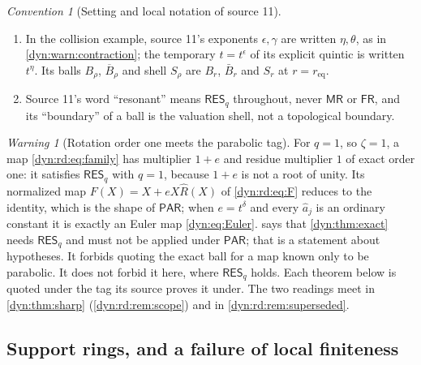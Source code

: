 \documentclass[11pt,letterpaper]{article}
\theoremstyle{definition}
\theoremstyle{remark}
\newtheorem{warning}[warning]{Warning}
\newtheorem{convention}[convention]{Convention}
\newcommand{\resq}{\mathsf{RES}_q}
\newcommand{\mres}{\mathsf{MR}}
\newcommand{\fres}{\mathsf{FR}}
\newcommand{\pares}{\mathsf{PAR}}
\numberwithin{equation}{section}
\begin{document}
\begin{convention}[Setting and local notation of source 11]
\begin{enumerate}[label=(\roman*)]
$\varsigma_\ell$, the elements $b_\ell$ are written $\mathfrak b_\ell$, the
polynomial $P(U)=\prod_\ell(U-b_\ell)$ is written $\mathcal S(U)$ with
coefficients $s_j$, the number $r$ of shells is written $N$, the maximum
$\sigma=\max_\ell\rho_\ell$ is written $r_{\max}$, a solution $\alpha$ of
$\alpha^{m}=c_\ell$ is written $\vartheta$, the reciprocal map $G$ is written
$f^{\vee}$, the clearing exponent $L$ is written $L_{\mathrm{cl}}$, and the
class $\Pi$ of purely infinite forms is written $\mathbb J$. In this report
$c=\lambda^{q}-1$, $G$ is the rescaled return \eqref{dyn:eq:G}, $\sigma$ is
the drifted rate, and $\Pi$ is the action projection of
\cref{dyn:sec:hamiltonian}.
\item In the collision example, source 11's exponents $\epsilon,\gamma$ are
written $\eta,\theta$, as in \cref{dyn:warn:contraction}; the temporary
$t=t^{\epsilon}$ of its explicit quintic is written $t^{\eta}$. Its balls
$B_\rho$, $\overline B_\rho$ and shell $S_\rho$ are $B_r$, $\bar B_r$ and
$S_r$ at $r=r_{\mathrm{eq}}$.
\item Source 11's word ``resonant'' means $\resq$ throughout, never $\mres$
or $\fres$, and its ``boundary'' of a ball is the valuation shell, not a
topological boundary.
\end{enumerate}
\end{convention}

\begin{warning}[Rotation order one meets the parabolic tag]
\label{dyn:rd:warn:qone}
For $q=1$, so $\zeta=1$, a map \eqref{dyn:rd:eq:family} has multiplier
$1+e$ and residue multiplier $1$ of exact order one: it satisfies $\resq$
with $q=1$, because $1+e$ is not a root of unity. Its normalized map
$F(X)=X+eX\widehat R(X)$ of \eqref{dyn:rd:eq:F} reduces to the identity,
which is the shape of $\pares$; when $e=t^{\delta}$ and every $\hat a_j$ is
an ordinary constant it is exactly an Euler map \eqref{dyn:eq:Euler}.
 says that \cref{dyn:thm:exact} needs $\resq$ and
must not be applied under $\pares$; that is a statement about hypotheses. It
forbids quoting the exact ball for a map known only to be parabolic. It does
not forbid it here, where $\resq$ holds. Each theorem below is quoted under
the tag its source proves it under. The two readings meet in
\cref{dyn:thm:sharp} (\cref{dyn:rd:rem:scope}) and in
\cref{dyn:rd:rem:superseded}.
\end{warning}

\subsection{Support rings, and a failure of local finiteness}
\label{dyn:rd:subsec:support}
\end{document}
